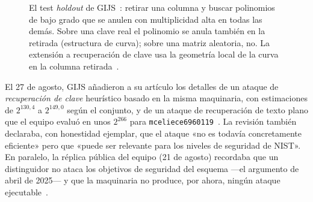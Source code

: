 \documentclass[11pt,a4paper,oneside]{report}
\begin{document}
\begin{figure}[htbp]
\centering
{}
\caption{El test \emph{holdout} de GIJS~\cite{ghoshal2026}: retirar
una columna y buscar polinomios de bajo grado que se anulen con
multiplicidad alta en todas las demás. Sobre una clave real el
polinomio se anula también en la retirada (estructura de curva);
sobre una matriz aleatoria, no. La extensión a recuperación de
clave usa la geometría local de la curva en la columna
retirada~\cite{vedenev2026,weis2026}.}
\label{fig:2026-holdout}
\end{figure}

El 27 de agosto, GIJS añadieron a su artículo los detalles de un
ataque de \emph{recuperación de clave} heurístico basado en la
misma maquinaria, con estimaciones de $2^{130{,}4}$ a $2^{149{,}0}$
según el conjunto, y de un ataque de recuperación de texto plano
que el equipo evaluó en unos $2^{266}$ para
\texttt{mceliece6960119}~\cite{ghoshal2026,cm610}. La revisión
también declaraba, con honestidad ejemplar, que el ataque «no es
todavía concretamente eficiente» pero que «puede ser relevante para
los niveles de seguridad de NIST». En paralelo, la réplica pública
del equipo (21 de agosto) recordaba que un distinguidor no ataca
los objetivos de seguridad del esquema ---el argumento de
abril de 2025--- y que la maquinaria no produce, por ahora, ningún
ataque ejecutable~\cite{bernstein2026,cm529}.
\end{document}
